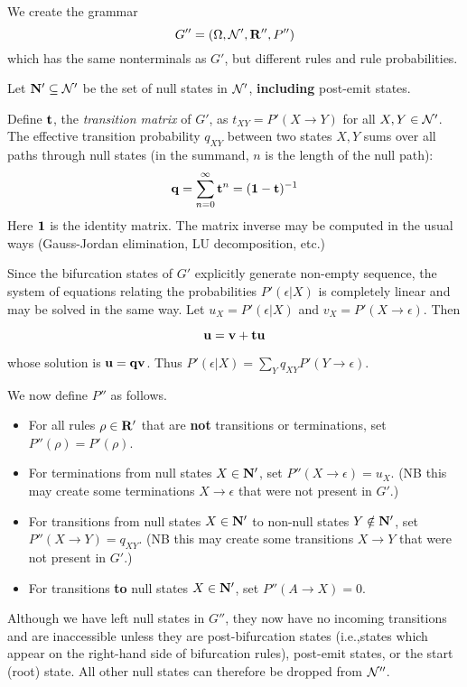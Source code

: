 \documentclass[10pt]{article}
\begin{document}
We create the grammar
\[
G'' = \left( \Omega, {\cal N}', {\bf R}'', P'' \right)
\]
which has the same nonterminals as $G'$, but different rules and rule probabilities.

Let ${\bf N}' \subseteq {\cal N}'$ be the set of null states in ${\cal N}'$, {\bf including} post-emit states.

Define ${\bf t}$, the {\em transition matrix} of $G'$, as $t_{XY} = P'(X \to Y)$ for all $X,Y \in {\cal N}'$.
The effective transition probability $q_{XY}$ between two states $X,Y$
sums over all paths through null states (in the summand, $n$ is the length of the null path):
\[
{\bf q} = \sum_{n=0}^\infty {\bf t}^n = ({\bf 1}-{\bf t})^{-1}
\]
Here ${\bf 1}$ is the identity matrix.
The matrix inverse may be computed in the usual ways (Gauss-Jordan elimination, LU decomposition, etc.)

Since the bifurcation states of $G'$ explicitly generate non-empty sequence,
the system of equations relating the probabilities $P'(\epsilon|X)$ is completely linear
and may be solved in the same way.
Let $u_X = P'(\epsilon|X)$ and $v_X = P'(X \to \epsilon)$.
Then

\[
{\bf u} = {\bf v} + {\bf tu}
\]

whose solution is ${\bf u} = {\bf qv}$.
Thus $P'(\epsilon|X) = \sum_Y q_{XY} P'(Y \to \epsilon)$.

We now define $P''$ as follows.
\begin{itemize}
\item For all rules $\rho \in {\bf R}'$ that are {\bf not} transitions or terminations, set $P''(\rho) = P'(\rho)$.
\item For terminations from null states $X \in {\bf N}'$, set $P''(X \to \epsilon) = u_X$.
(NB this may create some terminations $X \to \epsilon$ that were not present in $G'$.)
\item For transitions from null states $X \in {\bf N}'$ to non-null states $Y \notin {\bf N}'$, set $P''(X \to Y) = q_{XY}$.
(NB this may create some transitions $X \to Y$ that were not present in $G'$.)
\item For transitions {\bf to} null states $X \in {\bf N}'$, set $P''(A \to X) = 0$.
\end{itemize}

Although we have left null states in $G''$, they now have no incoming transitions
and are inaccessible unless they are post-bifurcation states (i.e.,states which appear on the right-hand side of bifurcation rules), post-emit states, or the start (root) state.
All other null states can therefore be dropped from ${\cal N}''$.
\end{document}
